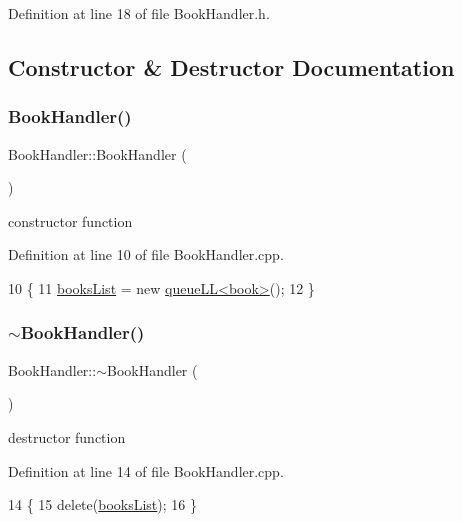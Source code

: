 Definition at line 18 of file Book\+Handler.\+h.



\subsection{Constructor \& Destructor Documentation}
\mbox{\label{class_book_handler_a73362998148ff419f5dccd629f858832}} 
\subsubsection{\texorpdfstring{Book\+Handler()}{BookHandler()}}
{\footnotesize\ttfamily Book\+Handler\+::\+Book\+Handler (\begin{DoxyParamCaption}{ }\end{DoxyParamCaption})}

constructor function 

Definition at line 10 of file Book\+Handler.\+cpp.


\begin{DoxyCode}
10                          \{
11     \hyperlink{class_book_handler_a13a6c78422b3ad7acd5ebdb9555a0286}{booksList} = \textcolor{keyword}{new} \hyperlink{classqueue_l_l}{queueLL<book>}();
12 \}
\end{DoxyCode}
\mbox{\label{class_book_handler_afd60e561a18f17d087da3c8b04d0c842}} 
\subsubsection{\texorpdfstring{$\sim$\+Book\+Handler()}{~BookHandler()}}
{\footnotesize\ttfamily Book\+Handler\+::$\sim$\+Book\+Handler (\begin{DoxyParamCaption}{ }\end{DoxyParamCaption})\hspace{0.3cm}{\ttfamily [virtual]}}

destructor function 

Definition at line 14 of file Book\+Handler.\+cpp.


\begin{DoxyCode}
14                           \{
15     \textcolor{keyword}{delete}(\hyperlink{class_book_handler_a13a6c78422b3ad7acd5ebdb9555a0286}{booksList});
16 \}
\end{DoxyCode}


